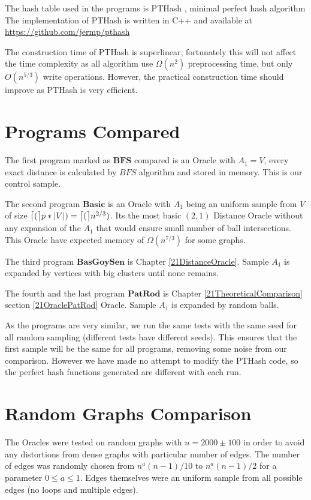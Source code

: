 \documentclass[shortabstract, lic, english]{iithesis}
\theoremstyle{definition} \newtheorem{definition}{Definition}[chapter]
\theoremstyle{remark} \newtheorem{remark}[definition]{Observation}
\theoremstyle{plain} \newtheorem{theorem}[definition]{Theorem}
\theoremstyle{plain} \newtheorem{lemma}[definition]{Lemma}
\theoremstyle{plain} \newtheorem{conjecture}[definition]{Conjecture}
\DeclarePairedDelimiter{\ceil}{\lceil}{\rceil}
\begin{document}
The hash table used in the programs is PTHash \cite{hashTablePractical}, minimal perfect hash algorithm
The implementation of PTHash is written in C++ and available at
\newline 
\url{https://github.com/jermp/pthash}

The construction time of PTHash is superlinear, fortunately this will not affect the time complexity as all algorithm use $\Omega(n^2)$ preprocessing time,
but only $O(n^{5/3})$ write operations. However, the practical construction time should improve as PTHash is very efficient.

\section{Programs Compared}

The first program marked as $\mathbf{BFS}$ compared is an Oracle with $A_1 = V$, 
every exact distance is calculated by $BFS$ algorithm and stored in memory.
This is our control sample.

The second program $\mathbf{Basic}$ is an Oracle with $A_1$ being an uniform sample from $V$ of size $\ceil[\big](p*|V|) = \ceil[\big](n^{2/3})$.
Its the most basic $(2,1)$ Distance Oracle without any expansion of the $A_1$ that would ensure small number of ball intersections.
This Oracle have expected memory of $\Omega(n^{7/3})$ for some graphs.

The third program $\mathbf{BasGoySen}$ is Chapter \ref{21DistanceOracle}. Sample $A_1$ is expanded by vertices with big clusters until none remains.

The fourth and the last program $\mathbf{PatRod}$ is Chapter \ref{21TheoreticalComparison} section \ref{21OraclePatRod} Oracle. Sample $A_1$ is expanded by random balls.

As the programs are very similar, we run the same tests with the same seed for all random sampling (different tests have different seeds).
This ensures that the first sample will be the same for all programs, removing some noise from our comparison.
However we have made no attempt to modify the PTHash code, so the perfect hash functions generated are different with each run.



\section{Random Graphs Comparison}

The Oracles were tested on random graphs with $n = 2000 \pm 100$ in order to avoid any distortions from dense graphs with particular number of edges.
The number of edges was randomly chosen from $n^a(n - 1)/10$ to $n^a(n-1)/2$ for a parameter $0 \leq a \leq 1$.
Edges themselves were an uniform sample from all possible edges (no loops and multiple edges).
\end{document}
